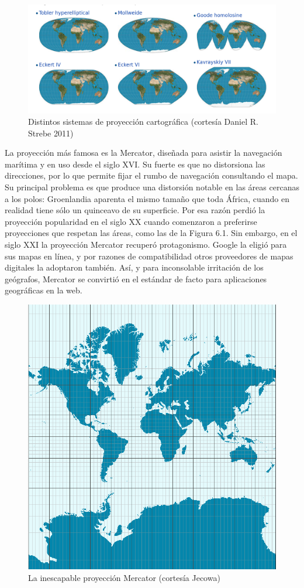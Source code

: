 \documentclass[]{book}
\begin{document}
\begin{figure}
\includegraphics[width=9.49in]{imagenes/proyecciones} \caption{Distintos sistemas de proyección cartográfica (cortesía Daniel R. Strebe 2011)}\label{fig:unnamed-chunk-141}
\end{figure}

La proyección más famosa es la Mercator, diseñada para asistir la
navegación marítima y en uso desde el siglo XVI. Su fuerte es que no
distorsiona las direcciones, por lo que permite fijar el rumbo de
navegación consultando el mapa. Su principal problema es que produce una
distorsión notable en las áreas cercanas a los polos: Groenlandia
aparenta el mismo tamaño que toda África, cuando en realidad tiene sólo
un quinceavo de su superficie. Por esa razón perdió la proyección
popularidad en el siglo XX cuando comenzaron a preferirse proyecciones
que respetan las áreas, como las de la Figura 6.1. Sin embargo, en el
siglo XXI la proyección Mercator recuperó protagonismo. Google la eligió
para sus mapas en línea, y por razones de compatibilidad otros
proveedores de mapas digitales la adoptaron también. Así, y para
inconsolable irritación de los geógrafos, Mercator se convirtió en el
estándar de facto para aplicaciones geográficas en la web.

\begin{figure}
\includegraphics[width=4.53in]{imagenes/Mercator-proj} \caption{La inescapable proyección Mercator (cortesía Jecowa)}\label{fig:unnamed-chunk-142}
\end{figure}
\end{document}

